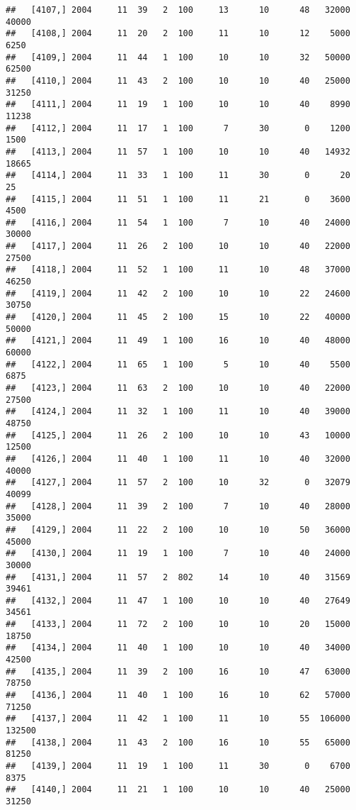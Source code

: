 \documentclass{article}\usepackage[]{graphicx}\usepackage[]{color}
\makeatletter
\newenvironment{kframe}{%
 \def\at@end@of@kframe{}%
 \ifinner\ifhmode%
  \def\at@end@of@kframe{\end{minipage}}%
  \begin{minipage}{\columnwidth}%
 \fi\fi%
 \def\FrameCommand##1{\hskip\@totalleftmargin \hskip-\fboxsep
 \colorbox{shadecolor}{##1}\hskip-\fboxsep
     \hskip-\linewidth \hskip-\@totalleftmargin \hskip\columnwidth}%
 \MakeFramed {\advance\hsize-\width
   \@totalleftmargin\z@ \linewidth\hsize
   \@setminipage}}%
 {\par\unskip\endMakeFramed%
 \at@end@of@kframe}
\newenvironment{knitrout}{}{} %
\makeatother
\begin{document}
\begin{knitrout}
\begin{kframe}
\begin{verbatim}
##   [4107,] 2004     11  39   2  100     13      10      48   32000   40000
##   [4108,] 2004     11  20   2  100     11      10      12    5000    6250
##   [4109,] 2004     11  44   1  100     10      10      32   50000   62500
##   [4110,] 2004     11  43   2  100     10      10      40   25000   31250
##   [4111,] 2004     11  19   1  100     10      10      40    8990   11238
##   [4112,] 2004     11  17   1  100      7      30       0    1200    1500
##   [4113,] 2004     11  57   1  100     10      10      40   14932   18665
##   [4114,] 2004     11  33   1  100     11      30       0      20      25
##   [4115,] 2004     11  51   1  100     11      21       0    3600    4500
##   [4116,] 2004     11  54   1  100      7      10      40   24000   30000
##   [4117,] 2004     11  26   2  100     10      10      40   22000   27500
##   [4118,] 2004     11  52   1  100     11      10      48   37000   46250
##   [4119,] 2004     11  42   2  100     10      10      22   24600   30750
##   [4120,] 2004     11  45   2  100     15      10      22   40000   50000
##   [4121,] 2004     11  49   1  100     16      10      40   48000   60000
##   [4122,] 2004     11  65   1  100      5      10      40    5500    6875
##   [4123,] 2004     11  63   2  100     10      10      40   22000   27500
##   [4124,] 2004     11  32   1  100     11      10      40   39000   48750
##   [4125,] 2004     11  26   2  100     10      10      43   10000   12500
##   [4126,] 2004     11  40   1  100     11      10      40   32000   40000
##   [4127,] 2004     11  57   2  100     10      32       0   32079   40099
##   [4128,] 2004     11  39   2  100      7      10      40   28000   35000
##   [4129,] 2004     11  22   2  100     10      10      50   36000   45000
##   [4130,] 2004     11  19   1  100      7      10      40   24000   30000
##   [4131,] 2004     11  57   2  802     14      10      40   31569   39461
##   [4132,] 2004     11  47   1  100     10      10      40   27649   34561
##   [4133,] 2004     11  72   2  100     10      10      20   15000   18750
##   [4134,] 2004     11  40   1  100     10      10      40   34000   42500
##   [4135,] 2004     11  39   2  100     16      10      47   63000   78750
##   [4136,] 2004     11  40   1  100     16      10      62   57000   71250
##   [4137,] 2004     11  42   1  100     11      10      55  106000  132500
##   [4138,] 2004     11  43   2  100     16      10      55   65000   81250
##   [4139,] 2004     11  19   1  100     11      30       0    6700    8375
##   [4140,] 2004     11  21   1  100     10      10      40   25000   31250

\end{verbatim}
\end{kframe}
\end{knitrout}
\end{document}
